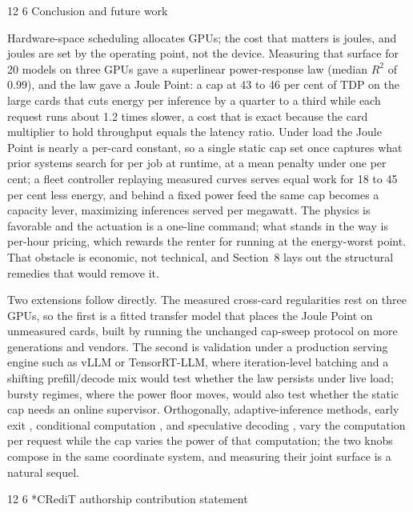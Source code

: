 \documentclass[3p,twocolumn]{elsarticle}
\makeatletter
\renewcommand\section{\@startsection{section}{1}{\z@}%
           {12\p@ \@plus 4\p@ \@minus 4\p@}%
           {6\p@ \@plus 4\p@ \@minus 3\p@}%
           {\normalsize\bfseries\boldmath}}
\makeatother
\begin{document}
\section{Conclusion and future work}\label{conclusion-and-future-work}

Hardware-space scheduling allocates GPUs; the cost that matters is joules, and joules are set by the operating point, not the device. Measuring that surface for 20 models on three GPUs gave a superlinear power-response law (median {\(R^2\)} of 0.99), and the law gave a Joule Point: a cap at 43 to 46 per cent of TDP on the large cards that cuts energy per inference by a quarter to a third while each request runs about 1.2 times slower, a cost that is exact because the card multiplier to hold throughput equals the latency ratio. Under load the Joule Point is nearly a per-card constant, so a single static cap set once captures what prior systems search for per job at runtime, at a mean penalty under one per cent; a fleet controller replaying measured curves serves equal work for 18 to 45 per cent less energy, and behind a fixed power feed the same cap becomes a capacity lever, maximizing inferences served per megawatt. The physics is favorable and the actuation is a one-line command; what stands in the way is per-hour pricing, which rewards the renter for running at the energy-worst point. That obstacle is economic, not technical, and Section~8 lays out the structural remedies that would remove it.

Two extensions follow directly. The measured cross-card regularities rest on three GPUs, so the first is a fitted transfer model that places the Joule Point on unmeasured cards, built by running the unchanged cap-sweep protocol on more generations and vendors. The second is validation under a production serving engine such as vLLM or TensorRT-LLM, where iteration-level batching and a shifting prefill/decode mix would test whether the law persists under live load; bursty regimes, where the power floor moves, would also test whether the static cap needs an online supervisor. Orthogonally, adaptive-inference methods, early exit \cite{ref5, ref11}, conditional computation \cite{ref6, ref7}, and speculative decoding \cite{ref8}, vary the computation per request while the cap varies the power of that computation; the two knobs compose in the same coordinate system, and measuring their joint surface is a natural sequel.

\section*{CRediT authorship contribution statement}\label{credit-authorship-contribution-statement}
\end{document}
